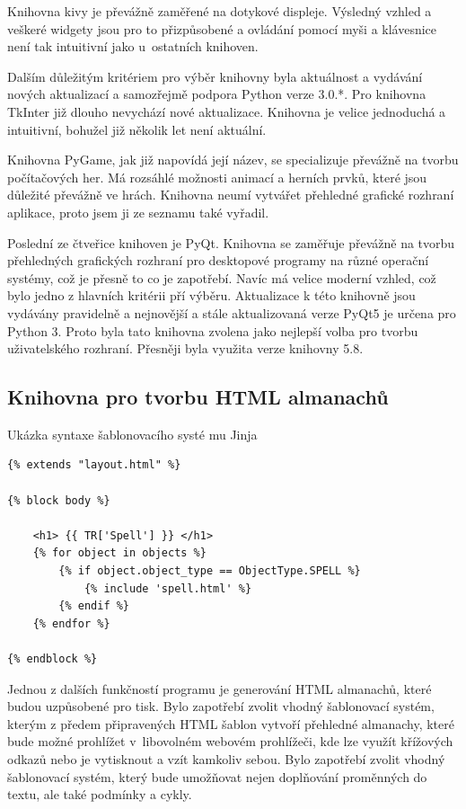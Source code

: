 \documentclass[thesis=B,czech]{resources/FITthesis}[2012/06/26]
\begin{document}
Knihovna kivy je převážně zaměřené na dotykové displeje. Výsledný vzhled a veškeré widgety jsou pro to přizpůsobené a ovládání pomocí myši a klávesnice není tak intuitivní jako u~ostatních knihoven.\par

Dalším důležitým kritériem pro výběr knihovny byla aktuálnost a vydávání nových aktualizací a samozřejmě podpora Python verze 3.0.*. Pro knihovna TkInter již dlouho nevychází nové aktualizace. Knihovna je velice jednoduchá a intuitivní, bohužel již několik let není aktuální. \par

Knihovna PyGame, jak již napovídá její název, se specializuje převážně na tvorbu počítačových her. Má rozsáhlé možnosti animací a herních prvků, které jsou důležité převážně ve hrách. Knihovna neumí vytvářet přehledné grafické rozhraní aplikace, proto jsem ji ze seznamu také vyřadil.\par

Poslední ze čtveřice knihoven je PyQt. Knihovna se zaměřuje převážně na tvorbu přehledných grafických rozhraní pro desktopové programy na různé operační systémy, což je přesně to co je zapotřebí. Navíc má velice moderní vzhled, což bylo jedno z hlavních kritérii pří výběru. Aktualizace k této knihovně jsou vydávány pravidelně a nejnovější a stále aktualizovaná verze PyQt5 je určena pro Python 3. Proto byla tato knihovna zvolena jako nejlepší volba pro tvorbu uživatelského rozhraní. Přesněji byla využita verze knihovny 5.8.
\subsection{Knihovna pro tvorbu HTML almanachů}
\begin{listing}[htbp]
\caption{\label{code:jinja}Ukázka syntaxe šablonovacího systé	mu Jinja}
\begin{verbatim}
{% extends "layout.html" %}

{% block body %}

    <h1> {{ TR['Spell'] }} </h1>
    {% for object in objects %}
        {% if object.object_type == ObjectType.SPELL %}
            {% include 'spell.html' %}
        {% endif %}
    {% endfor %}
    
{% endblock %}

\end{verbatim}
\end{listing}
Jednou z dalších funkčností programu je generování HTML almanachů, které budou uzpůsobené pro tisk. Bylo zapotřebí zvolit vhodný šablonovací systém, kterým z předem připravených HTML šablon vytvoří přehledné almanachy, které bude možné prohlížet v~libovolném webovém prohlížeči, kde lze využít křížových odkazů nebo je vytisknout a vzít kamkoliv sebou. Bylo zapotřebí zvolit vhodný šablonovací systém, který bude umožňovat nejen doplňování proměnných do textu, ale také podmínky a cykly.\par
\end{document}
